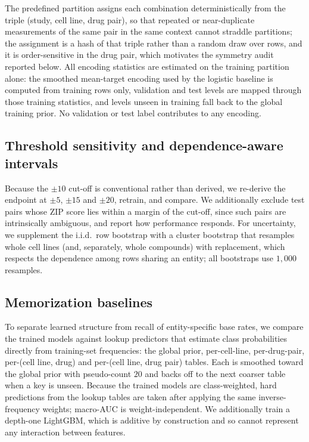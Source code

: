 \documentclass[11pt]{article}
\begin{document}
The predefined partition assigns each combination deterministically from the triple (study, cell line,
drug pair), so that repeated or near-duplicate measurements of the same pair in the same context cannot
straddle partitions; the assignment is a hash of that triple rather than a random draw over rows, and
it is order-sensitive in the drug pair, which motivates the symmetry audit reported below. All encoding
statistics are estimated on the training partition alone: the smoothed mean-target encoding used by the
logistic baseline is computed from training rows only, validation and test levels are mapped through
those training statistics, and levels unseen in training fall back to the global training prior. No
validation or test label contributes to any encoding.

\subsection{Threshold sensitivity and dependence-aware intervals}
Because the $\pm 10$ cut-off is conventional rather than derived, we re-derive the endpoint at
$\pm 5$, $\pm 15$ and $\pm 20$, retrain, and compare. We additionally exclude test pairs whose ZIP
score lies within a margin of the cut-off, since such pairs are intrinsically ambiguous, and report how
performance responds. For uncertainty, we supplement the i.i.d.\ row bootstrap with a cluster bootstrap
that resamples whole cell lines (and, separately, whole compounds) with replacement, which respects the
dependence among rows sharing an entity; all bootstraps use $1{,}000$ resamples.

\subsection{Memorization baselines}
To separate learned structure from recall of entity-specific base rates, we compare the trained models
against lookup predictors that estimate class probabilities directly from training-set frequencies:
the global prior, per-cell-line, per-drug-pair, per-(cell line, drug) and per-(cell line, drug pair)
tables. Each is smoothed toward the global prior with pseudo-count $20$ and backs off to the next
coarser table when a key is unseen. Because the trained models are class-weighted, hard predictions
from the lookup tables are taken after applying the same inverse-frequency weights; macro-AUC is
weight-independent. We additionally train a depth-one LightGBM, which is additive by construction and
so cannot represent any interaction between features.
\end{document}
